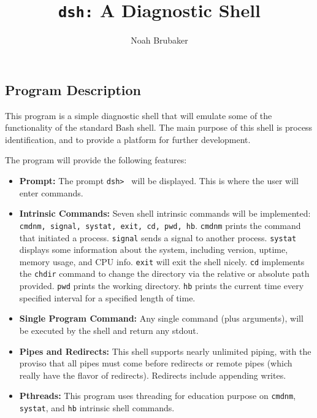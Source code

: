 \documentclass[11pt,a4paper]{article}
\author{Noah Brubaker}
\title{\texttt{dsh:} A Diagnostic Shell}
\newcommand{\nl}{\vspace{10pt}}
\begin{document}
\newcommand{\Center}[1]{\begin{center} #1
\end{center} }
\maketitle
{}
\flushleft

\subsection*{Program Description}

This program is a simple diagnostic shell that will emulate some of the functionality of the standard Bash shell. The main purpose of this shell is process identification, and to provide a platform for further development.\nl

The program will provide the following features:
\begin{itemize}

\item \textbf{Prompt:} The prompt \texttt{dsh> } will be displayed. This is where the user will enter commands. 

\item \textbf{Intrinsic Commands:} Seven shell intrinsic commands will be implemented: \texttt{cmdnm, signal, systat, exit, cd, pwd, hb}. \texttt{cmdnm} prints the command that initiated a process. \texttt{signal} sends a signal to another process. \texttt{systat} displays some information about the system, including version, uptime, memory usage, and CPU info. \texttt{exit} will exit the shell nicely. \texttt{cd} implements the \texttt{chdir} command to change the directory via the relative or absolute path provided. \texttt{pwd} prints the working directory. \texttt{hb} prints the current time every specified interval for a specified length of time.

\item \textbf{Single Program Command:} Any single command (plus arguments), will be executed by the shell and return any stdout.

\item \textbf{Pipes and Redirects:} This shell supports nearly unlimited piping, with the proviso that all pipes must come before redirects or remote pipes (which really have the flavor of redirects). Redirects include appending writes.

\item \textbf{Pthreads:} This program uses threading for education purpose on \texttt{cmdnm}, \texttt{systat}, and \texttt{hb} intrinsic shell commands.

\end{itemize}
\end{document}
